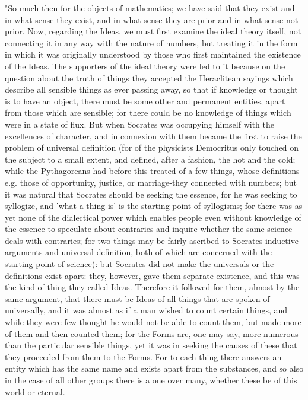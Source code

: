 "So much then for the objects of mathematics; we have said that they
exist and in what sense they exist, and in what sense they are prior
and in what sense not prior. Now, regarding the Ideas, we must first
examine the ideal theory itself, not connecting it in any way with
the nature of numbers, but treating it in the form in which it was
originally understood by those who first maintained the existence
of the Ideas. The supporters of the ideal theory were led to it because
on the question about the truth of things they accepted the Heraclitean
sayings which describe all sensible things as ever passing away, so
that if knowledge or thought is to have an object, there must be some
other and permanent entities, apart from those which are sensible;
for there could be no knowledge of things which were in a state of
flux. But when Socrates was occupying himself with the excellences
of character, and in connexion with them became the first to raise
the problem of universal definition (for of the physicists Democritus
only touched on the subject to a small extent, and defined, after
a fashion, the hot and the cold; while the Pythagoreans had before
this treated of a few things, whose definitions-e.g. those of opportunity,
justice, or marriage-they connected with numbers; but it was natural
that Socrates should be seeking the essence, for he was seeking to
syllogize, and 'what a thing is' is the starting-point of syllogisms;
for there was as yet none of the dialectical power which enables people
even without knowledge of the essence to speculate about contraries
and inquire whether the same science deals with contraries; for two
things may be fairly ascribed to Socrates-inductive arguments and
universal definition, both of which are concerned with the starting-point
of science):-but Socrates did not make the universals or the definitions
exist apart: they, however, gave them separate existence, and this
was the kind of thing they called Ideas. Therefore it followed for
them, almost by the same argument, that there must be Ideas of all
things that are spoken of universally, and it was almost as if a man
wished to count certain things, and while they were few thought he
would not be able to count them, but made more of them and then counted
them; for the Forms are, one may say, more numerous than the particular
sensible things, yet it was in seeking the causes of these that they
proceeded from them to the Forms. For to each thing there answers
an entity which has the same name and exists apart from the substances,
and so also in the case of all other groups there is a one over many,
whether these be of this world or eternal. 

